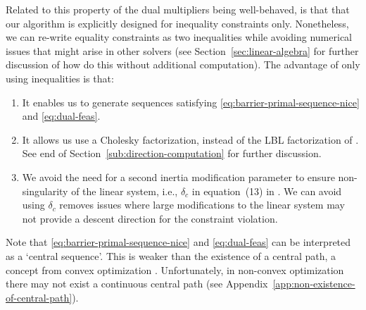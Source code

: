 \documentclass{article}
\begin{document}
Related to this property of the dual multipliers being well-behaved, is that that our algorithm is explicitly designed for inequality constraints only. Nonetheless, we can re-write equality constraints as two inequalities while avoiding numerical issues that might arise in other solvers \cite{haeser2017behavior}  (see Section~\ref{sec:linear-algebra} for further discussion of how do this without additional computation). The advantage of only using inequalities is that: 
\begin{enumerate}
\item It enables us to generate sequences satisfying \eqref{eq:barrier-primal-sequence-nice} and \eqref{eq:dual-feas}.
\item It allows us use a Cholesky factorization, instead of the  LBL factorization of \citet*{bunch1971direct}. See end of Section~\ref{sub:direction-computation} for further discussion.
\item We avoid the need for a second inertia modification parameter to ensure non-singularity of the linear system, i.e., $\delta_{c}$ in equation~(13) in \cite{wachter2006implementation}.  We can avoid using $\delta_{c}$ removes issues where large modifications to the linear system may not provide a descent direction for the constraint violation. 
\end{enumerate}



Note that \eqref{eq:barrier-primal-sequence-nice} and \eqref{eq:dual-feas} can be interpreted as a `central sequence'. This is weaker than the existence of a central path, a concept from convex optimization \cite{megiddo1989pathways,andersen1999homogeneous}. Unfortunately, in non-convex optimization there may not exist a continuous central path (see Appendix~\ref{app:non-existence-of-central-path}).
\end{document}
